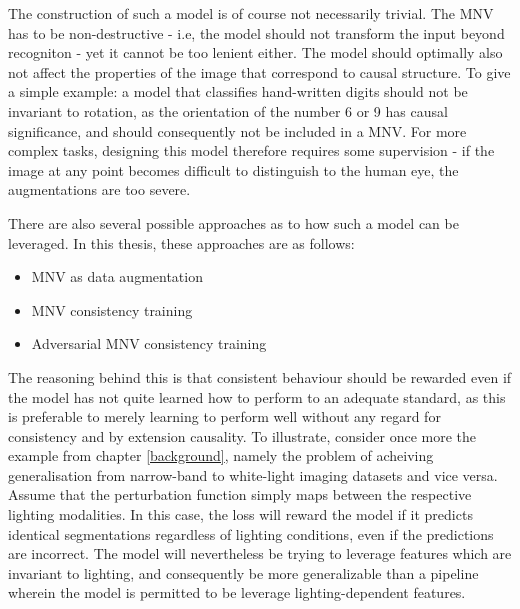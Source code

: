 		The construction of such a model is of course not necessarily trivial. The MNV has to be non-destructive - i.e, the model should not transform the input beyond recogniton - yet it cannot be too lenient either. The model should optimally also not affect the properties of the image that correspond to causal structure. To give a simple example: a model that classifies hand-written digits should not be invariant to rotation, as the orientation of the number 6 or 9 has causal significance, and should consequently not be included in a MNV. For more complex tasks, designing this model therefore requires some supervision - if the image at any point becomes difficult to distinguish to the human eye, the augmentations are too severe. 
	
		There are also several possible approaches as to how such a model can be leveraged. In this thesis, these approaches are as follows:
		\begin{itemize}
			\item MNV as data augmentation
			\item MNV consistency training
			\item Adversarial MNV consistency training
		\end{itemize}
	
		The reasoning behind this is that consistent behaviour should be rewarded even if the model has not quite learned how to perform to an adequate standard, as this is preferable to merely learning to perform well without any regard for consistency and by extension causality.  To illustrate, consider once more the example from chapter \ref{background}, namely the problem of acheiving generalisation from narrow-band to white-light imaging datasets and vice versa. Assume that the perturbation function simply maps between the respective lighting modalities. In this case, the loss will reward the model if it predicts identical segmentations regardless of lighting conditions, even if the predictions are incorrect. The model will nevertheless be trying to leverage features which are invariant to lighting, and consequently be more generalizable than a pipeline wherein the model is permitted to be leverage lighting-dependent features.


